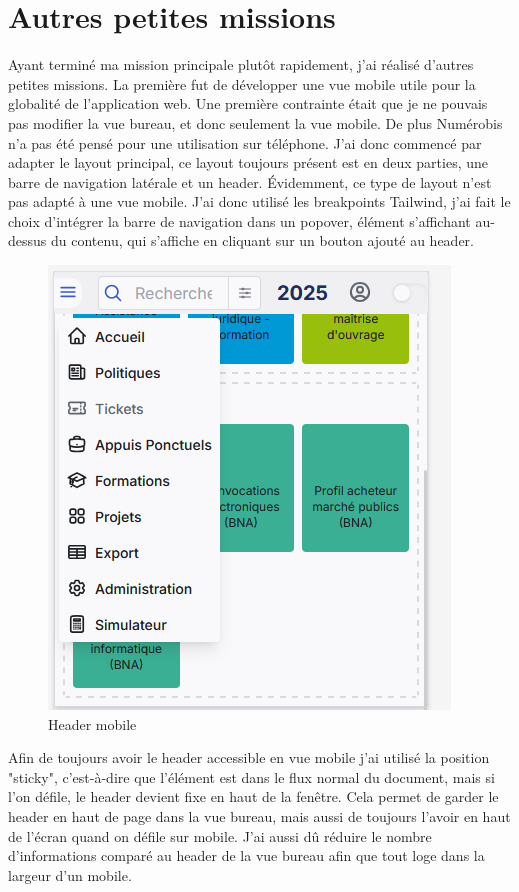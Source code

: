 \documentclass[a4paper,12pt]{report}
\begin{document}
\section{Autres petites missions}
Ayant terminé ma mission principale plutôt rapidement, j'ai réalisé d'autres petites missions. La première fut de développer une vue mobile utile pour la globalité de l'application web. Une première contrainte était que je ne pouvais pas modifier la vue bureau, et donc seulement la vue mobile. De plus Numérobis n'a pas été pensé pour une utilisation sur téléphone. J'ai donc commencé par adapter le layout principal, ce layout toujours présent est en deux parties, une barre de navigation latérale et un header. Évidemment, ce type de layout n'est pas adapté à une vue mobile. J'ai donc utilisé les breakpoints Tailwind, j'ai fait le choix d'intégrer la barre de navigation dans un popover, élément s'affichant au-dessus du contenu, qui s'affiche en cliquant sur un bouton ajouté au header.

\begin{figure}[H]
    \centering
    \includegraphics[scale=0.6]{headerMob.png}
    \caption{Header mobile}
    \label{fig:header-mob}
\end{figure}

Afin de toujours avoir le header accessible en vue mobile j'ai utilisé la position "sticky", c'est-à-dire que l'élément est dans le flux normal du document, mais si l'on défile, le header devient fixe en haut de la fenêtre. Cela permet de garder le header en haut de page dans la vue bureau, mais aussi de toujours l'avoir en haut de l'écran quand on défile sur mobile. J'ai aussi dû réduire le nombre d'informations comparé au header de la vue bureau afin que tout loge dans la largeur d'un mobile.
\end{document}
